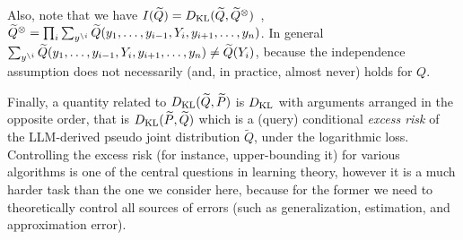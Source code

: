 \documentclass[a4paper]{article}
\theoremstyle{plain}
\theoremstyle{definition}
\theoremstyle{plain}
\begin{document}
Also, note that
we have $I(\widetilde {Q}) = D_{\mathrm{KL}}(\widetilde {Q}, \widetilde {Q}^{\otimes})$~,
  $\widetilde {Q}^{\otimes} = \prod_i \sum_{y ^{\backslash i}} \widetilde Q(y_1, \ldots, y_{i-1}, Y_i, y_{i+1}, \ldots, y_n)$.
 In general $\sum_{y ^{\backslash i}} \widetilde Q(y_1, \ldots, y_{i-1}, Y_i, y_{i+1}, \ldots, y_n) \not = \widetilde Q(Y_i)$, because the independence assumption  does not necessarily (and, in practice, almost never) holds for $Q$.

Finally, a quantity related to $D_{\mathrm{KL}}(\widetilde {Q} , \widetilde P)$ is
$D_{\mathrm{KL}}$ with arguments arranged in the opposite order, that is
$D_{\mathrm{KL}}(\widetilde P, \widetilde Q)$ which is a (query) conditional \emph{excess risk}
of the LLM-derived pseudo joint distribution $\widetilde Q$, under the logarithmic
loss.  Controlling the excess risk (for instance,
upper-bounding it) for various algorithms is one of the central questions in
learning theory, however it is a much harder task than the one we consider here, because for the former
we need to theoretically control all sources of errors (such as
generalization, estimation, and approximation error).
%
\end{document}
